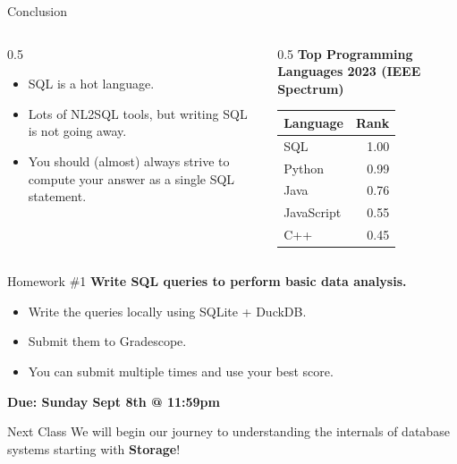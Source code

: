 \documentclass[aspectratio=169]{beamer}
\begin{document}
\begin{frame}{Conclusion}
    \begin{columns}
        \begin{column}{0.5\textwidth}
            \begin{itemize}
                \item SQL is a hot language.
                \item Lots of NL2SQL tools, but writing SQL is not going away.
                \item You should (almost) always strive to compute your answer as a single SQL statement.
            \end{itemize}
        \end{column}
        \begin{column}{0.5\textwidth}
            \textbf{Top Programming Languages 2023 (IEEE Spectrum)}
            \begin{table}
                \begin{tabular}{lr}
                \textbf{Language} & \textbf{Rank} \\ \hline
                \rowcolor{yellow} SQL & 1.00 \\
                Python & 0.99 \\
                Java & 0.76 \\
                JavaScript & 0.55 \\
                C++ & 0.45 \\
                \end{tabular}
            \end{table}
        \end{column}
    \end{columns}
\end{frame}

\begin{frame}{Homework \#1}
    \textbf{Write SQL queries to perform basic data analysis.}
    \begin{itemize}
        \item Write the queries locally using SQLite + DuckDB.
        \item Submit them to Gradescope.
        \item You can submit multiple times and use your best score.
    \end{itemize}
    \vspace{0.5cm}
    \textbf{Due: Sunday Sept 8th @ 11:59pm}
\end{frame}

\begin{frame}{Next Class}
    \centering
    \Large
    We will begin our journey to understanding the internals of database systems starting with \textbf{Storage}!
\end{frame}
\end{document}
